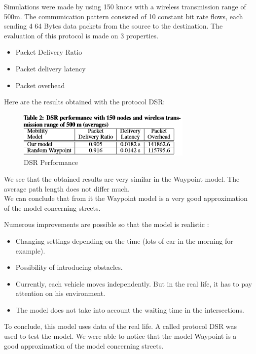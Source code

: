 Simulations were made by using 150 knots with a wireless transmission range of 500m. The communication  pattern  consisted of 10 constant bit rate flows, each sending 4 64 Bytes data packets from the source to the destination.
The evaluation of this protocol is made on 3 properties.
\begin{itemize}
\item Packet Delivery Ratio
\item Packet delivery latency
\item Packet overhead
\end{itemize}

Here are the results obtained with the protocol DSR:\\

\begin{figure}[h]
\center
\includegraphics{../images/protocoleDSR.png}
\caption{\label{ProtDSR}DSR Performance}
\end{figure}

We see that the obtained results are very similar in the Waypoint model. The average path length does not differ much.\\
We can conclude that from it the Waypoint model is a very good approximation of the model concerning streets.

Numerous improvements are possible so that the model is realistic :

\begin{itemize}
\item Changing settings depending on the time (lots of car in the morning for example).
\item Possibility of introducing obstacles.
\item Currently, each vehicle moves independently. But in the real life, it has to pay attention on his environment.
\item The model does not take into account the waiting time in the intersections.
\end{itemize}

To conclude, this model uses data of the real life. A called protocol DSR was used to test the model. We were able to notice that the model Waypoint is a good approximation of the model concerning streets.

